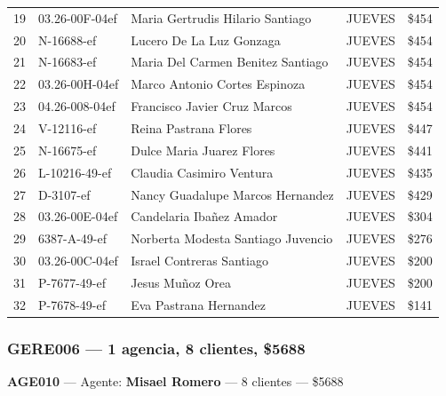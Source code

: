 \documentclass[11pt,a4paper]{article}
\newcommand{\money}[1]{\$\num{#1}}
\begin{document}
\begin{center}
\begin{longtable}{rlp{6.5cm}lr}
19 & 03.26-00F-04ef & Maria Gertrudis Hilario Santiago & JUEVES & \money{454} \\
20 & N-16688-ef & Lucero De La Luz Gonzaga & JUEVES & \money{454} \\
21 & N-16683-ef & Maria Del Carmen Benitez Santiago & JUEVES & \money{454} \\
22 & 03.26-00H-04ef & Marco Antonio Cortes Espinoza & JUEVES & \money{454} \\
23 & 04.26-008-04ef & Francisco Javier Cruz Marcos & JUEVES & \money{454} \\
24 & V-12116-ef & Reina Pastrana Flores & JUEVES & \money{447} \\
25 & N-16675-ef & Dulce Maria Juarez Flores & JUEVES & \money{441} \\
26 & L-10216-49-ef & Claudia Casimiro Ventura & JUEVES & \money{435} \\
27 & D-3107-ef & Nancy Guadalupe Marcos Hernandez & JUEVES & \money{429} \\
28 & 03.26-00E-04ef & Candelaria Ibañez Amador & JUEVES & \money{304} \\
29 & 6387-A-49-ef & Norberta Modesta Santiago Juvencio & JUEVES & \money{276} \\
30 & 03.26-00C-04ef & Israel Contreras Santiago & JUEVES & \money{200} \\
31 & P-7677-49-ef & Jesus Muñoz Orea & JUEVES & \money{200} \\
32 & P-7678-49-ef & Eva Pastrana Hernandez & JUEVES & \money{141} \\

\bottomrule
\end{longtable}
\end{center}
\subsubsection{GERE006 --- 1 agencia, 8 clientes, \money{5688}}

\noindent\textbf{AGE010} --- Agente: \textbf{Misael Romero} --- 8 clientes --- \money{5688}
\end{document}
